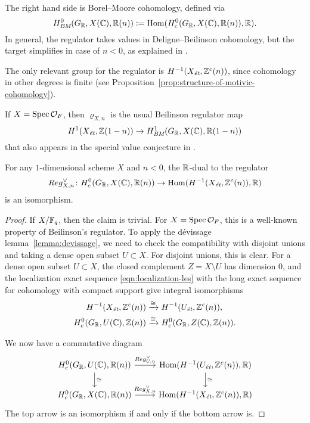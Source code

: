 \documentclass[draft]{article}
\numberwithin{equation}{section}
\begin{document}
The right hand side is Borel--Moore cohomology, defined via
\[ H^0_\BM (G_\RR, X(\CC), \RR(n)) \dfn
  \Hom (H^0_c (G_\RR, X(\CC), \RR(n)), \RR). \]
In general, the regulator takes values in Deligne--Beilinson cohomology, but the
target simplifies in case of $n < 0$, as explained in
\cite[\S 2]{Beshenov-Weil-etale-2}.

\begin{remark}
  The only relevant group for the regulator is $H^{-1} (X_\et, \ZZ^c (n))$,
  since cohomology in other degrees is finite
  (see Proposition~\ref{prop:structure-of-motivic-cohomology}).
\end{remark}

\begin{remark}
  If $X = \Spec \mathcal{O}_F$, then $\varrho_{X,n}$ is the usual Beilinson
  regulator map
  \[ H^1 (X_\et, \ZZ (1-n)) \to H^1_\BM (G_\RR, X(\CC), \RR(1-n)) \]
  that also appears in the special value conjecture in
  \cite[\S 5.8.3]{Flach-Morin-2018}.
\end{remark}

\begin{lemma}
  \label{lemma:regulator-isomorphism}
  For any $1$-dimensional scheme $X$ and $n < 0$, the $\RR$-dual to the
  regulator
  \[ Reg_{X,n}^\vee\colon H^0_c (G_\RR, X(\CC), \RR(n)) \to
    \Hom (H^{-1} (X_\et, \ZZ^c (n)), \RR) \]
  is an isomorphism.

  \begin{proof}
    If $X/\FF_q$, then the claim is trivial. For $X = \Spec \mathcal{O}_F$, this
    is a well-known property of Beilinson's regulator. To apply the
    d\'{e}vissage lemma~\ref{lemma:devissage}, we need to check the
    compatibility with disjoint unions and taking a dense open subset
    $U \subset X$. For disjoint unions, this is clear. For a dense open subset
    $U \subset X$, the closed complement $Z = X\setminus U$ has dimension $0$,
    and the localization exact sequence \eqref{eqn:localization-les} with the
    long exact sequence for cohomology with compact support give integral
    isomorphisms
    \begin{align*}
      H^{-1} (X_\et, \ZZ^c (n)) & \xrightarrow{\cong} H^{-1} (U_\et, \ZZ^c (n)), \\
      H^0_c (G_\RR, U(\CC), \ZZ(n)) & \xrightarrow{\cong} H^0_c (G_\RR, Z(\CC), \ZZ(n)).
    \end{align*}

    We now have a commutative diagram
    \[ \begin{tikzcd}
        H^0_c (G_\RR, U(\CC), \RR(n)) \ar{r}{Reg_{U,n}^\vee} \ar{d}{\cong} &
        \Hom (H^{-1} (U_\et, \ZZ^c (n)), \RR) \ar{d}{\cong} \\
        H^0_c (G_\RR, X(\CC), \RR(n)) \ar{r}{Reg_{X,n}^\vee} &
        \Hom (H^{-1} (X_\et, \ZZ^c (n)), \RR)
      \end{tikzcd} \]
    The top arrow is an isomorphism if and only if the bottom arrow is.
  \end{proof}
\end{lemma}
\end{document}
